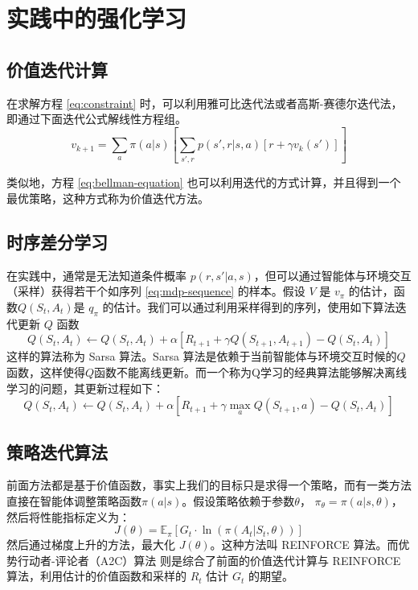 \section{实践中的强化学习}
\subsection{价值迭代计算}
在求解方程 \ref{eq:constraint} 时，可以利用雅可比迭代法或者高斯-赛德尔迭代法，即通过下面迭代公式解线性方程组。
\begin{equation}
    v_{k+1} = \sum_a \pi(a|s) \left[ \sum_{s', r} p(s', r | s, a)  \left[r + \gamma v_k(s') \right] \right]
\end{equation}

类似地，方程 \ref{eq:bellman-equation} 也可以利用迭代的方式计算，并且得到一个最优策略，这种方式称为价值迭代方法。

\subsection{时序差分学习}
在实践中，通常是无法知道条件概率 $p(r, s' | a, s)$，但可以通过智能体与环境交互（采样）获得若干个如序列 \ref{eq:mdp-sequence} 的样本。假设 $V$ 是 $v_\pi$ 的估计，函数$Q(S_t, A_t)$是 $q_\pi$ 的估计。我们可以通过利用采样得到的序列，使用如下算法迭代更新 $Q$ 函数
\begin{equation}
    Q(S_t, A_t) \leftarrow Q(S_t, A_t) + \alpha \left[ R_{t+1} + \gamma Q(S_{t+1}, A_{t+1}) - Q(S_t, A_t) \right]
\end{equation}
这样的算法称为 Sarsa 算法\cite{suttonReinforcementLearningIntroduction2018}。Sarsa 算法是依赖于当前智能体与环境交互时候的$Q$函数，这样使得$Q$函数不能离线更新。而一个称为Q学习\cite{watkinsQlearning1992}的经典算法能够解决离线学习的问题，其更新过程如下：
\begin{equation}
    Q(S_t, A_t) \leftarrow Q(S_t, A_t) + \alpha \left[ R_{t+1} + \gamma \max_{a} Q(S_{t+1}, a) - Q(S_t, A_t) \right]
\end{equation}


\subsection{策略迭代算法}
前面方法都是基于价值函数，事实上我们的目标只是求得一个策略，而有一类方法直接在智能体调整策略函数$\pi(a|s)$。假设策略依赖于参数$\theta$， $\pi_\theta = \pi(a|s,\theta)$，然后将性能指标定义为：
\begin{equation}
    J(\theta) = \mathbb{E}_\pi \left[ G_t \cdot  \ln(\pi(A_t|S_t, \theta))  \right]
\end{equation}
然后通过梯度上升的方法，最大化 $J(\theta)$。这种方法叫 REINFORCE 算法。而优势行动者-评论者（A2C）算法 \cite{mnihAsynchronousMethodsDeep2016} 则是综合了前面的价值迭代计算与 REINFORCE 算法，利用估计的价值函数和采样的 $R_t$ 估计 $G_t$ 的期望。


